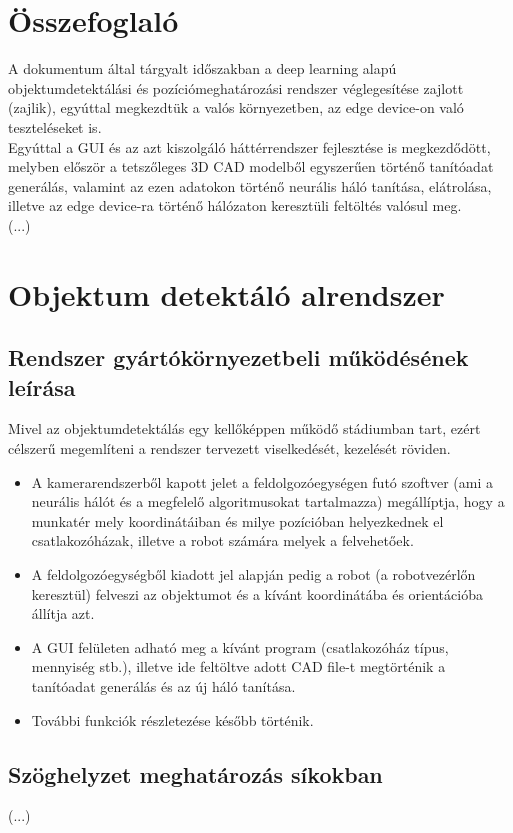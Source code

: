 \documentclass{article}
\begin{document}
\section{Összefoglaló}
A dokumentum által tárgyalt időszakban a deep learning alapú objektumdetektálási és
pozíciómeghatározási rendszer véglegesítése zajlott (zajlik), egyúttal megkezdtük a valós 
környezetben, az edge device-on való teszteléseket is.\\[5pt]
Egyúttal a GUI és az azt kiszolgáló háttérrendszer fejlesztése is megkezdődött, melyben először a tetszőleges 
3D CAD modelből egyszerűen történő tanítóadat generálás, valamint az ezen adatokon 
történő neurális háló tanítása, elátrolása, illetve az edge device-ra történő
hálózaton keresztüli feltöltés valósul meg.\\[5pt]
(...)


\section{Objektum detektáló alrendszer}
\subsection{Rendszer gyártókörnyezetbeli működésének leírása}
Mivel az objektumdetektálás egy kellőképpen működő stádiumban tart, 
ezért célszerű megemlíteni a rendszer tervezett viselkedését, kezelését
röviden.\\[5pt]
\begin{itemize}
  \item A kamerarendszerből kapott jelet a feldolgozóegységen futó 
  szoftver (ami a neurális hálót és a megfelelő algoritmusokat tartalmazza) 
  megállíptja, hogy a munkatér mely koordinátáiban és milye pozícióban helyezkednek 
  el csatlakozóházak, illetve a robot számára melyek a felvehetőek.
  \item A feldolgozóegységből kiadott jel alapján pedig a robot (a 
  robotvezérlőn keresztül) felveszi az objektumot és a kívánt koordinátába és
  orientációba állítja azt. 
  \item A GUI felületen adható meg a kívánt program (csatlakozóház típus, mennyiség stb.),
  illetve ide feltöltve adott CAD file-t megtörténik a tanítóadat generálás
  és az új háló tanítása.
  \item További funkciók részletezése később történik.
\end{itemize}

\subsection{Szöghelyzet meghatározás síkokban}
(...)
\end{document}
